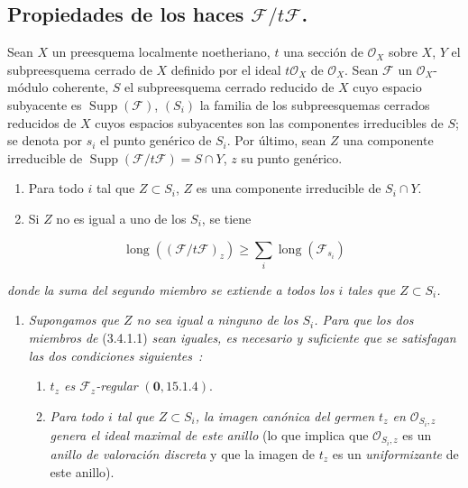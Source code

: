 \subsection{\texorpdfstring{Propiedades de los haces $\mathcal F/t\mathcal F$.}{Propiedades de los haces F/tF}}

\begin{proposition}[3.4.1]
\label{IV.2.3.4.1-fr}
Sean $X$ un preesquema localmente noetheriano, $t$ una sección de
$\mathcal O_X$ sobre $X$, $Y$ el subpreesquema cerrado de $X$ definido por
el ideal $t\mathcal O_X$ de $\mathcal O_X$. Sean $\mathcal F$ un
$\mathcal O_X$-módulo coherente, $S$ el subpreesquema cerrado reducido de
$X$ cuyo espacio subyacente es $\operatorname{Supp}(\mathcal F)$, $(S_i)$ la
familia de los subpreesquemas cerrados reducidos de $X$ cuyos espacios
subyacentes son las componentes irreducibles de $S$; se denota por $s_i$ el
punto genérico de $S_i$. Por último, sean $Z$ una componente irreducible de
$\operatorname{Supp}(\mathcal F/t\mathcal F)=S\cap Y$, $z$ su punto
genérico.
\begin{enumerate}
\item[\textup{(i)}] Para todo $i$ tal que $Z\subset S_i$, $Z$ es una componente
irreducible de $S_i\cap Y$.
\item[\textup{(ii)}] Si $Z$ no es igual a uno de los $S_i$, se tiene
\end{enumerate}
\end{proposition}

\begin{env}[3.4.1.1]
\label{IV.2.3.4.1.1-fr}
\[
\operatorname{long}((\mathcal F/t\mathcal F)_z)
\geqslant\sum_i\operatorname{long}(\mathcal F_{s_i})
\]
\end{env}

\textit{donde la suma del segundo miembro se extiende a todos los $i$ tales que
$Z\subset S_i$.}

\begin{enumerate}
\item[(iii)] \textit{Supongamos que $Z$ no sea igual a ninguno de los $S_i$. Para que
los dos miembros de} (3.4.1.1) \textit{sean iguales, es necesario y suficiente que se
satisfagan las dos condiciones siguientes~:}
\begin{enumerate}
\item[$\alpha$)] \textit{$t_z$ es $\mathcal F_z$-regular} $(\mathbf{0},15.1.4)$.
\item[$\beta$)] \textit{Para todo $i$ tal que $Z\subset S_i$, la imagen canónica del
germen $t_z$ en $\mathcal O_{S_i,z}$ genera el ideal maximal de este anillo}
(lo que implica que $\mathcal O_{S_i,z}$ es un \emph{anillo de valoración discreta} y
que la imagen de $t_z$ es un \emph{uniformizante} de este anillo).
\end{enumerate}
\end{enumerate}

